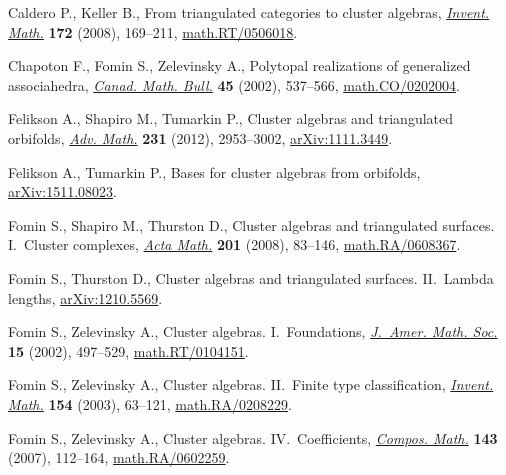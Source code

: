 \documentclass[pdftex]{sigma}
\numberwithin{equation}{section}
\begin{document}
\begin{thebibliography}{99}
\footnotesize\itemsep=0pt

Caldero P., Keller B., From triangulated categories to cluster algebras,
 \href{http://dx.doi.org/10.1007/s00222-008-0111-4}{\textit{Invent. Math.}} \textbf{172} (2008), 169--211,
 \href{http://arxiv.org/abs/math.RT/0506018}{math.RT/0506018}.

Chapoton F., Fomin S., Zelevinsky A., Polytopal realizations of generalized
 associahedra, \href{http://dx.doi.org/10.4153/CMB-2002-054-1}{\textit{Canad. Math. Bull.}} \textbf{45} (2002), 537--566,
 \href{http://arxiv.org/abs/math.CO/0202004}{math.CO/0202004}.

Felikson A., Shapiro M., Tumarkin P., Cluster algebras and triangulated
 orbifolds, \href{http://dx.doi.org/10.1016/j.aim.2012.07.032}{\textit{Adv. Math.}} \textbf{231} (2012), 2953--3002,
 \href{http://arxiv.org/abs/1111.3449}{arXiv:1111.3449}.

Felikson A., Tumarkin P., Bases for cluster algebras from orbifolds,
 \href{http://arxiv.org/abs/1511.08023}{arXiv:1511.08023}.

Fomin S., Shapiro M., Thurston D., Cluster algebras and triangulated surfaces.
 {I}.~{C}luster complexes, \href{http://dx.doi.org/10.1007/s11511-008-0030-7}{\textit{Acta Math.}} \textbf{201} (2008), 83--146,
 \href{http://arxiv.org/abs/math.RA/0608367}{math.RA/0608367}.

Fomin S., Thurston D., Cluster algebras and triangulated surfaces.
 {II}.~{L}ambda lengths, \href{http://arxiv.org/abs/1210.5569}{arXiv:1210.5569}.

Fomin S., Zelevinsky A., Cluster algebras. {I}.~{F}oundations, \href{http://dx.doi.org/10.1090/S0894-0347-01-00385-X}{\textit{J.~Amer.
 Math. Soc.}} \textbf{15} (2002), 497--529, \href{http://arxiv.org/abs/math.RT/0104151}{math.RT/0104151}.

Fomin S., Zelevinsky A., Cluster algebras. {II}.~{F}inite type classif\/ication,
 \href{http://dx.doi.org/10.1007/s00222-003-0302-y}{\textit{Invent. Math.}} \textbf{154} (2003), 63--121,
 \href{http://arxiv.org/abs/math.RA/0208229}{math.RA/0208229}.

Fomin S., Zelevinsky A., Cluster algebras. {IV}.~{C}oef\/f\/icients,
 \href{http://dx.doi.org/10.1112/S0010437X06002521}{\textit{Compos. Math.}} \textbf{143} (2007), 112--164,
 \href{http://arxiv.org/abs/math.RA/0602259}{math.RA/0602259}.


\end{thebibliography}
\end{document}
